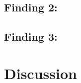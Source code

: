 \subsection{Finding 2:}
\subsection{Finding 3:}

\section{Discussion}

\clearpage 
\printbibliography

